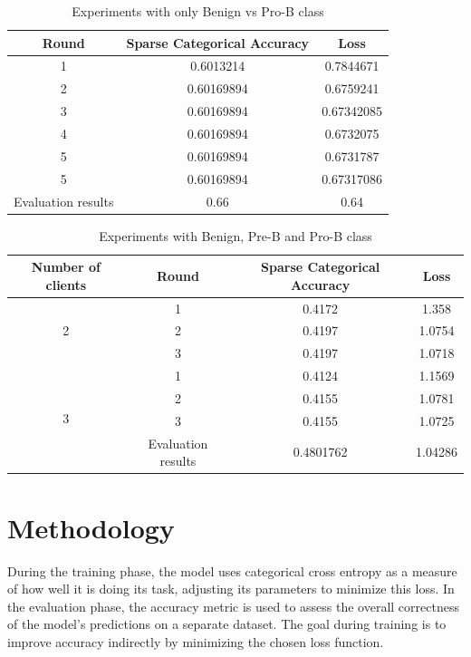 \documentclass[runningheads,a4paper,11pt]{report}
\begin{document}
\begin{table}[htb!]
\centering
\begin{tabular}{|c|c|c|}
\hline
\textbf{Round} & \textbf{Sparse Categorical Accuracy} & \textbf{Loss} \\
\hline
1 & 0.6013214 & 0.7844671 \\
\hline
2 & 0.60169894 & 0.6759241 \\
\hline
3 & 0.60169894 & 0.67342085 \\
\hline
4 & 0.60169894 & 0.6732075 \\
\hline
5 & 0.60169894 & 0.6731787 \\
\hline
5 & 0.60169894 & 0.67317086 \\
\hline
Evaluation results & 0.66 & 0.64 \\
\hline
\end{tabular}

\caption{Experiments with only Benign vs Pro-B class}
\label{tab:results_adam_experiment_2}
\end{table} 

\begin{table}[htb!]
\centering
\begin{tabular}{|c|c|c|c|}
\hline
\textbf{Number of clients} & \textbf{Round} & \textbf{Sparse Categorical Accuracy} & \textbf{Loss} \\
\hline
\multirow{3}{1em}{2} & 1  & 0.4172 & 1.358 \\
 & 2 & 0.4197 & 1.0754 \\
 &  3 & 0.4197 & 1.0718 \\
\hline
\multirow{4}{1em}{3} & 1  & 0.4124 & 1.1569 \\
 & 2 & 0.4155 & 1.0781 \\
 &  3 & 0.4155 & 1.0725 \\
& Evaluation results & 0.4801762 &  1.04286\\
\hline
\end{tabular}
\caption{Experiments with Benign, Pre-B and Pro-B class}
\label{tab:results_adam_experiment_3}
\end{table}

\section{Methodology}
\label{section:methodology}

During the training phase, the model uses categorical cross entropy as a measure of how well it is doing its task, adjusting its parameters to minimize this loss. In the evaluation phase, the accuracy metric is used to assess the overall correctness of the model's predictions on a separate dataset. The goal during training is to improve accuracy indirectly by minimizing the chosen loss function. 
\end{document}
